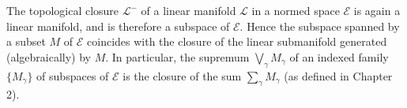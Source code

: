 The topological closure $\mathcal{L}^-$ of a linear manifold $\mathcal{L}$ in a normed space $\mathcal{E}$ is again a linear manifold, and is therefore a subspace of $\mathcal{E}$. Hence the subspace spanned by a subset $M$ of $\mathcal{E}$ coincides with the closure of the linear submanifold generated (algebraically) by $M$. In particular, the supremum $\bigvee_{\gamma} M_{\gamma}$ of an indexed family $\{M_{\gamma}\}$ of subspaces of $\mathcal{E}$ is the closure of the sum $\sum_{\gamma} M_{\gamma}$ (as defined in Chapter 2).
